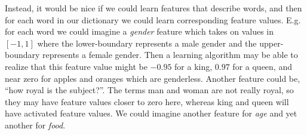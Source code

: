 \documentclass[12pt]{article}
\begin{document}
Instead, it would be nice if we could learn features that describe words, and then for each word in our dictionary we could learn corresponding feature values. E.g. for each word we could imagine a \emph{gender} feature which takes on values in $[-1, 1]$ where the lower-boundary represents a male gender and the upper-boundary represents a female gender. Then a learning algorithm may be able to realize that this feature value might be $-0.95$ for a king, $0.97$ for a queen, and near zero for apples and oranges which are genderless. Another feature could be, ``how royal is the subject?''.  The terms man and woman are not really royal, so they may have feature values closer to zero here, whereas king and queen will have activated feature values. We could imagine another feature for \emph{age} and yet another for \emph{food}.
\end{document}
